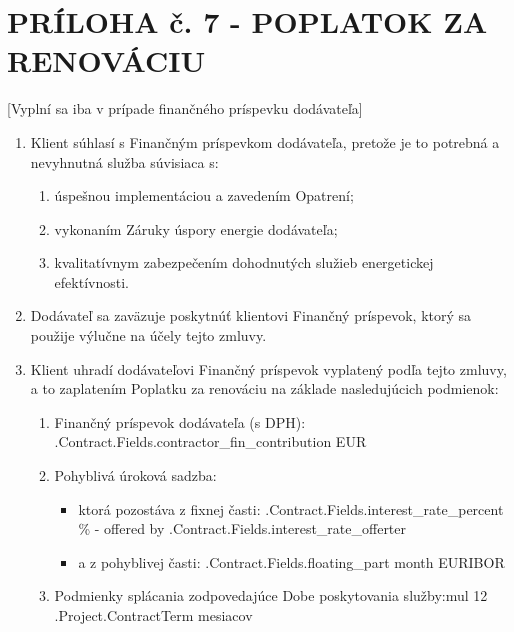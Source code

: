 \section{PRÍLOHA č. 7 {-} POPLATOK ZA RENOVÁCIU}
\begin{center}
	[Vyplní sa iba v prípade finančného príspevku dodávateľa]
\end{center}
\begin{enumerate}[label=\arabic*.]
	\item Klient súhlasí s Finančným príspevkom dodávateľa, pretože je to potrebná a nevyhnutná služba súvisiaca s:
	\begin{enumerate}
		\item úspešnou implementáciou a zavedením Opatrení;
		\item vykonaním Záruky úspory energie dodávateľa;
		\item kvalitatívnym zabezpečením dohodnutých služieb energetickej efektívnosti.
	\end{enumerate}

	\item Dodávateľ sa zaväzuje poskytnúť klientovi Finančný príspevok, ktorý sa použije výlučne na účely tejto zmluvy.

	\item Klient uhradí dodávateľovi Finančný príspevok vyplatený podľa tejto zmluvy, a to zaplatením Poplatku za renováciu na základe nasledujúcich podmienok:
	  \begin{enumerate}
		\item Finančný príspevok dodávateľa (s DPH): \iffalse input fields.contractor_fin_contribution value="{{.Contract.Fields.contractor_fin_contribution}}" \fi {{.Contract.Fields.contractor_fin_contribution}} EUR
		\item Pohyblivá úroková sadzba:
			\begin{itemize}
				\item ktorá pozostáva z fixnej časti: \iffalse input fields.interest_rate_percent value="{{.Contract.Fields.interest_rate_percent}}" \fi {{.Contract.Fields.interest_rate_percent}} \% {-} offered by \iffalse input fields.interest_rate_offerter value="{{.Contract.Fields.interest_rate_offerter}}" \fi {{.Contract.Fields.interest_rate_offerter}}
				\item a z pohyblivej časti:	 \iffalse input fields.floating_part value="{{.Contract.Fields.floating_part}}" \fi {{.Contract.Fields.floating_part}} month EURIBOR
			\end{itemize}
		\item Podmienky splácania zodpovedajúce Dobe poskytovania služby:{{mul 12 .Project.ContractTerm}} mesiacov
	\end{enumerate}


\end{enumerate}
